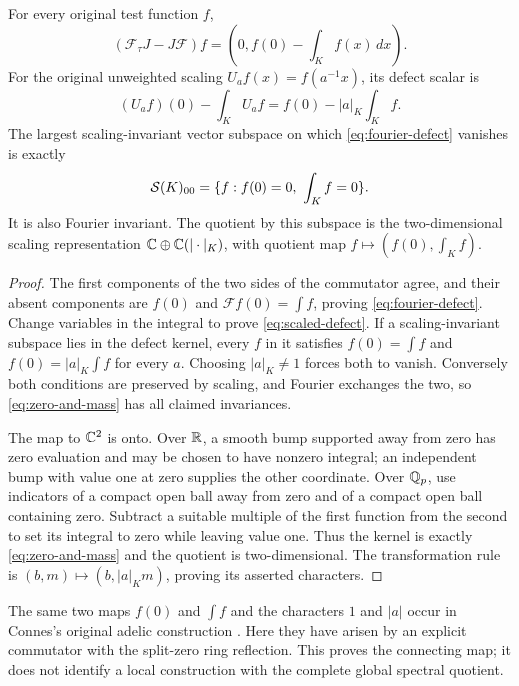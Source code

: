 \begin{theorem}\label{thm:fourier-defect}
For every original test function $f$,
\begin{equation}\label{eq:fourier-defect}
 (\mathcal F_\tau J-J\mathcal F)f
 =\left(0,f(0)-\int_Kf(x)\,dx\right).
\end{equation}
For the original unweighted scaling $U_af(x)=f(a^{-1}x)$, its defect scalar is
\begin{equation}\label{eq:scaled-defect}
 (U_af)(0)-\int_KU_af=f(0)-|a|_K\int_Kf.
\end{equation}
The largest scaling-invariant vector subspace on which \eqref{eq:fourier-defect} vanishes is exactly
\begin{equation}\label{eq:zero-and-mass}
 \mathcal S(K)_{00}=\{f:f(0)=0,\ \int_Kf=0\}.
\end{equation}
It is also Fourier invariant. The quotient by this subspace is the two-dimensional scaling representation $\mathbb C\oplus\mathbb C(|\cdot|_K)$, with quotient map $f\mapsto(f(0),\int_Kf)$.
\end{theorem}
\begin{proof}
The first components of the two sides of the commutator agree, and their absent components are $f(0)$ and $\mathcal Ff(0)=\int f$, proving \eqref{eq:fourier-defect}. Change variables in the integral to prove \eqref{eq:scaled-defect}. If a scaling-invariant subspace lies in the defect kernel, every $f$ in it satisfies $f(0)=\int f$ and $f(0)=|a|_K\int f$ for every $a$. Choosing $|a|_K\ne1$ forces both to vanish. Conversely both conditions are preserved by scaling, and Fourier exchanges the two, so \eqref{eq:zero-and-mass} has all claimed invariances.

The map to $\mathbb C^2$ is onto. Over $\mathbb R$, a smooth bump supported away from zero has zero evaluation and may be chosen to have nonzero integral; an independent bump with value one at zero supplies the other coordinate. Over $\mathbb Q_p$, use indicators of a compact open ball away from zero and of a compact open ball containing zero. Subtract a suitable multiple of the first function from the second to set its integral to zero while leaving value one. Thus the kernel is exactly \eqref{eq:zero-and-mass} and the quotient is two-dimensional. The transformation rule is $(b,m)\mapsto(b,|a|_Km)$, proving its asserted characters.
\end{proof}

The same two maps $f(0)$ and $\int f$ and the characters $1$ and $|a|$ occur in Connes's original adelic construction \cite[Section III, (6)--(11)]{Connes1998}. Here they have arisen by an explicit commutator with the split-zero ring reflection. This proves the connecting map; it does not identify a local construction with the complete global spectral quotient.


